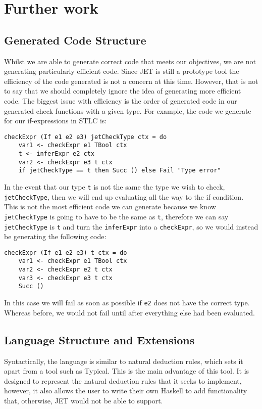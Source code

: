 \section{Further work}
\label{sec:furtherwork}

\subsection{Generated Code Structure}
Whilst we are able to generate correct code that meets our objectives, we are not generating particularly efficient code.
Since JET is still a prototype tool the efficiency of the code generated is not a concern at this time.
However, that is not to say that we should completely ignore the idea of generating more efficient code.
The biggest issue with efficiency is the order of generated code in our generated check functions with a given type.
For example, the code we generate for our if-expressions in STLC is:
\begin{lstlisting}
checkExpr (If e1 e2 e3) jetCheckType ctx = do
    var1 <- checkExpr e1 TBool ctx
    t <- inferExpr e2 ctx
    var2 <- checkExpr e3 t ctx
    if jetCheckType == t then Succ () else Fail "Type error"
\end{lstlisting}
In the event that our type \texttt{t} is not the same the type we wish to check, \texttt{jetCheckType}, then we will end up evaluating all the way to the if condition.
This is not the most efficient code we can generate because we know \texttt{jetCheckType} is going to have to be the same as \texttt{t}, therefore we can say \texttt{jetCheckType} is \texttt{t} and turn the \texttt{inferExpr} into a \texttt{checkExpr}, so we would instead be generating the following code:
\begin{lstlisting}
checkExpr (If e1 e2 e3) t ctx = do
    var1 <- checkExpr e1 TBool ctx
    var2 <- checkExpr e2 t ctx
    var3 <- checkExpr e3 t ctx
    Succ ()
\end{lstlisting}
In this case we will fail as soon as possible if \texttt{e2} does not have the correct type.
Whereas before, we would not fail until after everything else had been evaluated.

\subsection{Language Structure and Extensions}
Syntactically, the language is similar to natural deduction rules, which sets it apart from a tool such as Typical\cite{grimm2007typical}.
This is the main advantage of this tool.
It is designed to represent the natural deduction rules that it seeks to implement, however, it also allows the user to write their own Haskell to add functionality that, otherwise, JET would not be able to support.  

